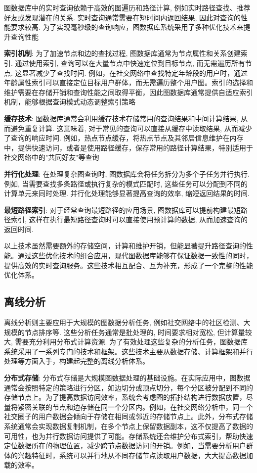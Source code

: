 图数据库中的实时查询依赖于高效的图遍历和路径计算, 例如实时路径查找、推荐好友或发现潜在的关系. 实时查询通常需要在短时间内返回结果, 因此对查询的性能要求较高. 为了实现毫秒级的查询响应，图数据库系统采用了多种优化技术来提升查询性能

\textbf{索引机制}: 为了加速节点和边的查找过程, 图数据库通常为节点属性和关系创建索引. 通过使用索引, 查询可以在大量节点中快速定位到目标节点, 而无需遍历所有节点. 这显著减少了查找时间. 例如，在社交网络中查找特定年龄段的用户时，通过年龄属性索引可以直接定位目标用户群体，而无需遍历整个用户图。索引的选择和维护需要在存储开销和查询性能之间取得平衡，因此图数据库通常提供自适应索引机制，能够根据查询模式动态调整索引策略

\textbf{缓存技术}: 图数据库通常会利用缓存技术存储常用的查询结果和中间计算结果, 从而避免重复计算. 这意味着, 对于常见的查询可以直接从缓存中读取结果, 从而减少了查询的响应时间. 例如，热点节点缓存，将热点节点及其邻居信息维护在内存中，提供快速访问，或者是使用路径缓存，保存常用的路径计算结果，特别适用于社交网络中的"共同好友"等查询


\textbf{并行化处理}: 在处理复杂图查询时, 图数据库会将任务拆分为多个子任务并行执行. 例如, 当需要查找多条路径或执行复杂的模式匹配时, 这些任务可以分配到不同的计算单元来同时处理. 并行化处理能够显著提高查询的效率, 缩短返回结果的时间.

\textbf{最短路径索引}: 对于经常查询最短路径的应用场景, 图数据库可以提前构建最短路径索引, 这样在执行最短路径查询时可以直接使用预计算的数据, 从而加速查询的返回时间.

以上技术虽然需要额外的存储空间，计算和维护开销，但能显著提升路径查询的性能。通过这些优化技术的组合应用，现代图数据库能够在保证数据一致性的同时，提供高效的实时查询服务。这些技术相互配合、互为补充，形成了一个完整的性能优化体系。

\vspace{1cm}
\subsection{离线分析}

离线分析则主要应用于大规模的图数据分析任务, 例如社交网络中的社区检测、大规模的节点排序等. 这些分析任务通常是批处理的, 时间要求相对宽松, 但计算量较大, 需要充分利用分布式计算资源. 为了有效处理这些复杂的分析任务，图数据库系统采用了一系列专门的技术和框架。这些技术主要从数据存储、计算框架和并行处理等方面入手，构建起完整的离线分析体系。

\textbf{分布式存储}: 分布式存储是大规模图数据处理的基础设施。在实际应用中，图数据通常会按照特定的策略进行分区，如边切分或顶点切分，每个分区被分配到不同的存储节点上。为了提高数据访问效率，系统会考虑图的拓扑结构进行数据放置，尽量将紧密关联的节点和边存储在同一个分区内。例如，在社交网络分析中，同一个社交圈子的用户数据会倾向于存储在相同或邻近的存储节点上。此外，分布式存储系统通常会实现数据复制机制，在多个节点上保留数据副本，这不仅提高了数据的可用性，也为并行数据访问提供了可能。存储系统还会维护分布式索引，帮助快速定位数据所在的物理位置，减少跨节点数据访问的开销。例如，当需要分析用户群体的兴趣特征时，系统可以并行地从不同存储节点读取用户数据，大大提高数据加载的效率。

